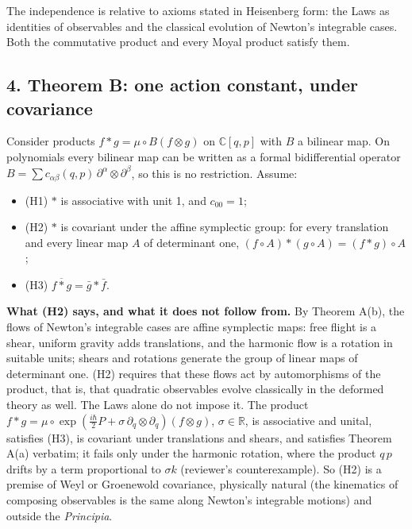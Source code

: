 \documentclass[11pt,a4paper]{article}
\newcommand{\tightlist}{\setlength{\itemsep}{0pt}\setlength{\parskip}{0pt}}
\begin{document}
The independence is relative to axioms stated in Heisenberg form: the
Laws as identities of observables and the classical evolution of
Newton's integrable cases. Both the commutative product and every Moyal
product satisfy them.

\hypertarget{theorem-b-one-action-constant-under-covariance}{%
\subsection{4. Theorem B: one action constant, under
covariance}\label{theorem-b-one-action-constant-under-covariance}}

Consider products \(f*g=\mu\circ B(f\otimes g)\) on \(\mathbb C[q,p]\)
with \(B\) a bilinear map. On polynomials every bilinear map can be
written as a formal bidifferential operator
\(B=\sum c_{\alpha\beta}(q,p)\,\partial^\alpha\otimes\partial^\beta\),
so this is no restriction. Assume:

\begin{itemize}
\tightlist
\item
  (H1) \(*\) is associative with unit 1, and \(c_{00}=1\);
\item
  (H2) \(*\) is covariant under the affine symplectic group: for every
  translation and every linear map \(A\) of determinant one,
  \((f\circ A)*(g\circ A)=(f*g)\circ A\);
\item
  (H3) \(\overline{f*g}=\bar g*\bar f\).
\end{itemize}

\textbf{What (H2) says, and what it does not follow from.} By Theorem
A(b), the flows of Newton's integrable cases are affine symplectic maps:
free flight is a shear, uniform gravity adds translations, and the
harmonic flow is a rotation in suitable units; shears and rotations
generate the group of linear maps of determinant one. (H2) requires that
these flows act by automorphisms of the product, that is, that quadratic
observables evolve classically in the deformed theory as well. The Laws
alone do not impose it. The product
\(f*g=\mu\circ\exp(\frac{i\hbar}2P+\sigma\,\partial_q\otimes\partial_q)(f\otimes g)\),
\(\sigma\in\mathbb R\), is associative and unital, satisfies (H3), is
covariant under translations and shears, and satisfies Theorem A(a)
verbatim; it fails only under the harmonic rotation, where the product
\(q\,p\) drifts by a term proportional to \(\sigma k\) (reviewer's
counterexample). So (H2) is a premise of Weyl or Groenewold covariance,
physically natural (the kinematics of composing observables is the same
along Newton's integrable motions) and outside the \emph{Principia}.
\end{document}
